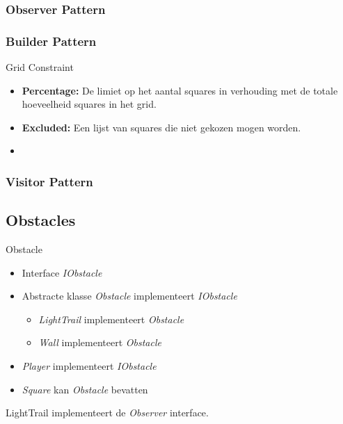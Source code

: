 \documentclass[t]{beamer}
\begin{document}
\subsubsection{Observer Pattern}
\begin{frame}
\begin{center}

\end{center}
\end{frame}

\subsubsection{Builder Pattern}
\begin{frame}
\begin{center}

\end{center}
\end{frame}
\begin{frame}{Grid Constraint}
\begin{itemize}
	\item \textbf{Percentage:} De limiet op het aantal squares in verhouding met de totale hoeveelheid squares in het grid.
	\item \textbf{Excluded:} Een lijst van squares die niet gekozen mogen worden.
	\item 
\end{itemize}
\end{frame}

\subsubsection{Visitor Pattern}
\begin{frame}
\begin{center}

\end{center}
\end{frame}
\subsection{Obstacles}
\begin{frame}{Obstacle}
\begin{center}
\begin{itemize}
	\item Interface \textit{IObstacle}
	\item  Abstracte klasse \textit{Obstacle} implementeert \textit{IObstacle}
	\begin{itemize}
		\item \textit{LightTrail} implementeert \textit{Obstacle}
		\item \textit{Wall} implementeert \textit{Obstacle}
	\end{itemize}
	\item \textit{Player} implementeert \textit{IObstacle}
	\item \textit{Square} kan \textit{Obstacle} bevatten
\end{itemize}
LightTrail implementeert de \textit{Observer} interface.
\end{center}
\end{frame}
\end{document}
